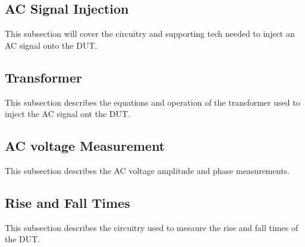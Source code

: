 \subsection {AC Signal Injection}

This subsection will cover the circuitry and supporting tech needed to inject an AC signal onto the DUT.

\subsection {Transformer}

This subsection describes the equations and operation of the transformer used to inject the AC signal ont the DUT.

\subsection {AC voltage Measurement}

This subsection describes the AC voltage amplitude and phase measurements. 

\subsection {Rise and Fall Times}

This subsection describes the circuitry used to mesaure the rise and fall times of the DUT.

